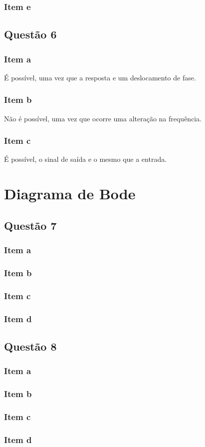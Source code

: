 \documentclass[a4paper, 12pt]{article}
\begin{document}
        \subsubsection{Item e}
    \subsection{Quest\~{a}o 6}
        \subsubsection{Item a}
        É possível, uma vez que a resposta e um deslocamento de fase.
        \subsubsection{Item b}
        Não é possível, uma vez que ocorre uma alteração na frequência.
        \subsubsection{Item c}
        É possível, o sinal de saída e o mesmo que a entrada.
\section{Diagrama de Bode}
    \subsection{Quest\~{a}o 7}
        \subsubsection{Item a}
        \subsubsection{Item b}
        \subsubsection{Item c}
        \subsubsection{Item d}
    \subsection{Quest\~{a}o 8}
        \subsubsection{Item a}
        \subsubsection{Item b}
        \subsubsection{Item c}
        \subsubsection{Item d}
\end{document}
